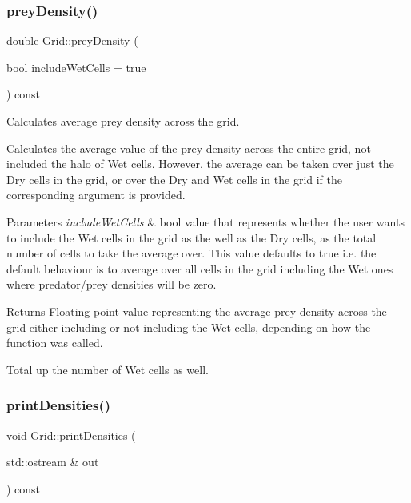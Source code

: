 \subsubsection{\texorpdfstring{prey\+Density()}{preyDensity()}}
{\footnotesize\ttfamily double Grid\+::prey\+Density (\begin{DoxyParamCaption}\item[{bool}]{include\+Wet\+Cells = {\ttfamily true} }\end{DoxyParamCaption}) const}



Calculates average prey density across the grid. 

Calculates the average value of the prey density across the entire grid, not included the halo of Wet cells. However, the average can be taken over just the Dry cells in the grid, or over the Dry and Wet cells in the grid if the corresponding argument is provided.


\begin{DoxyParams}{Parameters}
{\em include\+Wet\+Cells} & bool value that represents whether the user wants to include the Wet cells in the grid as the well as the Dry cells, as the total number of cells to take the average over. This value defaults to true i.\+e. the default behaviour is to average over all cells in the grid including the Wet ones where predator/prey densities will be zero.\\
\hline
\end{DoxyParams}
\begin{DoxyReturn}{Returns}
Floating point value representing the average prey density across the grid either including or not including the Wet cells, depending on how the function was called. 
\end{DoxyReturn}
Total up the number of Wet cells as well. \mbox{\label{class_grid_a4971cb9d47440bc63488993d5647f943}} 
\subsubsection{\texorpdfstring{print\+Densities()}{printDensities()}}
{\footnotesize\ttfamily void Grid\+::print\+Densities (\begin{DoxyParamCaption}\item[{std\+::ostream \&}]{out }\end{DoxyParamCaption}) const}



